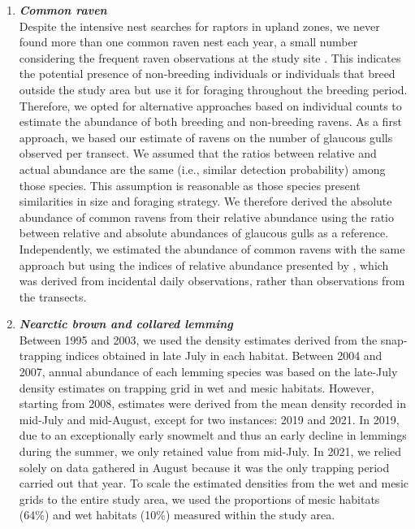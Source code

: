 \documentclass[a4paper,twoside,12pt]{article}
\begin{document}
\begin{enumerate}[label=\alph*.]
                \item[] \textit{\textbf{Common raven}}\\
                Despite the intensive nest searches for raptors in upland zones, we never found more than one common raven nest each year, a small number considering the frequent raven observations at the study site \citep{gauthier2024a}. This indicates the potential presence of non-breeding individuals or individuals that breed outside the study area but use it for foraging throughout the breeding period. Therefore, we opted for alternative approaches based on individual counts to estimate the abundance of both breeding and non-breeding ravens. 
As a first approach, we based our estimate of ravens on the number of glaucous gulls observed per transect. We assumed that the ratios between relative and actual abundance are the same (i.e., similar detection probability) among those species. This assumption is reasonable as those species present similarities in size and foraging strategy. We therefore derived the absolute abundance of common ravens from their relative abundance using the ratio between relative and absolute abundances of glaucous gulls as a reference.  
Independently, we estimated the abundance of common ravens with the same approach but using the indices of relative abundance presented by \citet{gauthier2024a}, which was derived from incidental daily observations, rather than observations from the transects.

        \item[] \textit{\textbf{Nearctic brown and collared lemming}}\\
        Between 1995 and 2003, we used the density estimates derived from the snap-trapping indices obtained in late July in each habitat. Between 2004 and 2007, annual abundance of each lemming species was based on the late-July density estimates on trapping grid in wet and mesic habitats. However, starting from 2008, estimates were derived from the mean density recorded in mid-July and mid-August, except for two instances: 2019 and 2021. In 2019, due to an exceptionally early snowmelt and thus an early decline in lemmings during the summer, we only retained value from mid-July. In 2021, we relied solely on data gathered in August because it was the only trapping period carried out that year. To scale the estimated densities from the wet and mesic grids to the entire study area, we used the proportions of mesic habitats (64\%) and wet habitats (10\%) measured within the study area.
        

\end{enumerate}
\end{document}
